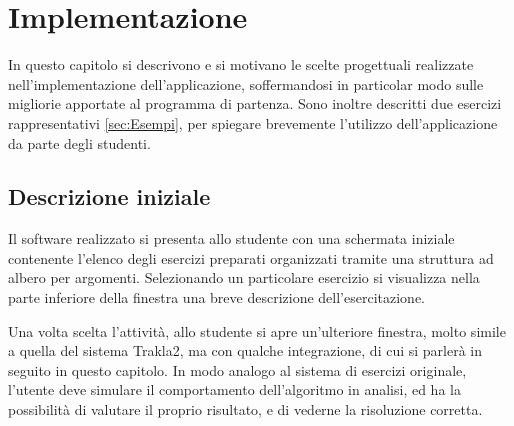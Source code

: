 
\chapter{Implementazione} 

In questo capitolo si descrivono e si motivano le scelte progettuali
realizzate nell'implementazione dell'applicazione, soffermandosi in
particolar modo sulle migliorie apportate al programma di partenza.
Sono inoltre descritti due esercizi rappresentativi \ref{sec:Esempi},
per spiegare brevemente l'utilizzo dell'applicazione da parte degli
studenti.


\section{Descrizione iniziale}

Il software realizzato si presenta allo studente con una schermata
iniziale contenente l'elenco degli esercizi preparati organizzati
tramite una struttura ad albero per argomenti. Selezionando un particolare
esercizio si visualizza nella parte inferiore della finestra una breve
descrizione dell'esercitazione.

Una volta scelta l'attività, allo studente si apre un'ulteriore finestra,
molto simile a quella del sistema Trakla2, ma con qualche integrazione,
di cui si parlerà in seguito in questo capitolo. In modo analogo al
sistema di esercizi originale, l'utente deve simulare il comportamento
dell'algoritmo in analisi, ed ha la possibilità di valutare il proprio
risultato, e di vederne la risoluzione corretta.

